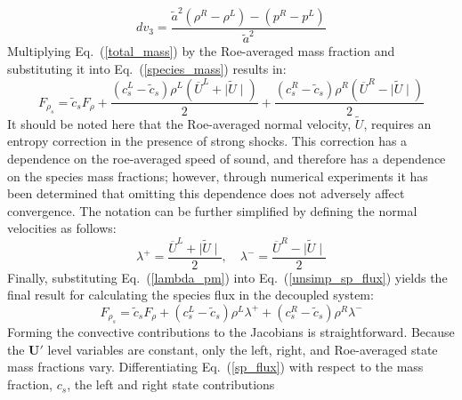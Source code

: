 \begin{equation}
	dv_3 = \frac{\tilde{a}^2 (\rho^R-\rho^L)-(p^R-p^L)}{\tilde{a}^2}
\end{equation}
Multiplying Eq.~(\ref{total_mass}) by the Roe-averaged mass fraction and
substituting it into Eq.~(\ref{species_mass}) results in:
\begin{equation}
\label{unsimp_sp_flux}
	F_{\rho_s} =\tilde{c}_s F_\rho + \frac{(c_s^L-\tilde{c}_s)\rho^L(\overline{U}^L+\mid \tilde{U}\mid)}{2}
	+ \frac{(c_s^R-\tilde{c}_s)\rho^R(\overline{U}^R-\mid \tilde{U}\mid)}{2}
\end{equation}
It should be noted here that the Roe-averaged normal velocity, $\tilde{U}$,
requires an entropy correction in the presence of strong shocks\cite{harten}.
This correction has a dependence on the roe-averaged speed of sound, and
therefore has a dependence on the species mass fractions; however,
through numerical experiments it has been determined that omitting this
dependence does not adversely affect convergence.  The notation can be further
simplified by defining the normal velocities as follows:
\begin{equation} \label{lambda_pm} \lambda^+ = \frac{\overline{U}^L+\mid
  \tilde{U}\mid}{2}, \quad \lambda^- = \frac{\overline{U}^R-\mid
  \tilde{U}\mid}{2} \end{equation}
Finally, substituting Eq.~(\ref{lambda_pm}) into Eq.~(\ref{unsimp_sp_flux})
yields the final result for calculating the species flux in the decoupled
system:
\begin{equation} \label{sp_flux} F_{\rho_s} =\tilde{c}_s F_\rho +
  (c_s^L-\tilde{c}_s)\rho^L\lambda^+ + (c_s^R-\tilde{c}_s)\rho^R\lambda^-
\end{equation}
Forming the convective contributions to the Jacobians is straightforward.
Because the $\mathbf{U}'$ level variables are constant, only the left, right,
and Roe-averaged state mass fractions vary.  Differentiating Eq.~(\ref{sp_flux})
with respect to the mass fraction, $c_s$, the left and right state contributions
